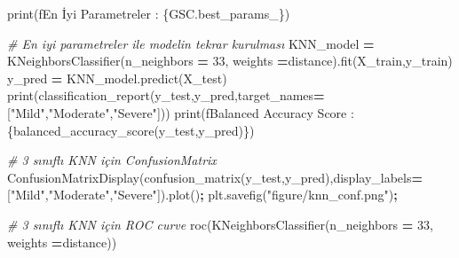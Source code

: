 \documentclass[12pt,twoside]{deuthesis}
\newenvironment{Shaded}{\begin{snugshade}}{\end{snugshade}}
\newcommand{\BuiltInTok}[1]{#1}
\newcommand{\CommentTok}[1]{\textcolor[rgb]{0.56,0.35,0.01}{\textit{#1}}}
\newcommand{\DecValTok}[1]{\textcolor[rgb]{0.00,0.00,0.81}{#1}}
\newcommand{\NormalTok}[1]{#1}
\newcommand{\OperatorTok}[1]{\textcolor[rgb]{0.81,0.36,0.00}{\textbf{#1}}}
\newcommand{\SpecialCharTok}[1]{\textcolor[rgb]{0.00,0.00,0.00}{#1}}
\newcommand{\SpecialStringTok}[1]{\textcolor[rgb]{0.31,0.60,0.02}{#1}}
\newcommand{\StringTok}[1]{\textcolor[rgb]{0.31,0.60,0.02}{#1}}
\begin{document}
\begin{Shaded}
\begin{Highlighting}[]
\BuiltInTok{print}\NormalTok{(}\SpecialStringTok{f\textquotesingle{}En İyi Parametreler : }\SpecialCharTok{\{}\NormalTok{GSC}\SpecialCharTok{.}\NormalTok{best\_params\_}\SpecialCharTok{\}}\SpecialStringTok{\textquotesingle{}}\NormalTok{)}
\end{Highlighting}
\end{Shaded}
\begin{Shaded}
\begin{Highlighting}[]
\CommentTok{\# En iyi parametreler ile modelin tekrar kurulması}
\NormalTok{KNN\_model }\OperatorTok{=}\NormalTok{ KNeighborsClassifier(n\_neighbors }\OperatorTok{=} \DecValTok{33}\NormalTok{,}
\NormalTok{                                 weights }\OperatorTok{=}\StringTok{\textquotesingle{}distance\textquotesingle{}}\NormalTok{).fit(X\_train,y\_train)}
\NormalTok{y\_pred }\OperatorTok{=}\NormalTok{ KNN\_model.predict(X\_test)}
\BuiltInTok{print}\NormalTok{(classification\_report(y\_test,y\_pred,target\_names}\OperatorTok{=}\NormalTok{[}\StringTok{"Mild"}\NormalTok{,}\StringTok{"Moderate"}\NormalTok{,}\StringTok{"Severe"}\NormalTok{]))}
\BuiltInTok{print}\NormalTok{(}\SpecialStringTok{f\textquotesingle{}Balanced Accuracy Score : }\SpecialCharTok{\{}\NormalTok{balanced\_accuracy\_score(y\_test,y\_pred)}\SpecialCharTok{\}}\SpecialStringTok{\textquotesingle{}}\NormalTok{)}
\end{Highlighting}
\end{Shaded}
\begin{Shaded}
\begin{Highlighting}[]
\CommentTok{\# 3 sınıflı KNN için ConfusionMatrix}
\NormalTok{ConfusionMatrixDisplay(confusion\_matrix(y\_test,y\_pred),display\_labels}\OperatorTok{=}\NormalTok{[}\StringTok{"Mild"}\NormalTok{,}\StringTok{"Moderate"}\NormalTok{,}\StringTok{"Severe"}\NormalTok{]).plot()}\OperatorTok{;}
\NormalTok{plt.savefig(}\StringTok{"figure/knn\_conf.png"}\NormalTok{)}\OperatorTok{;}
\end{Highlighting}
\end{Shaded}
\begin{Shaded}
\begin{Highlighting}[]
\CommentTok{\# 3 sınıflı KNN için ROC curve}
\NormalTok{roc(KNeighborsClassifier(n\_neighbors }\OperatorTok{=} \DecValTok{33}\NormalTok{,}
\NormalTok{                         weights }\OperatorTok{=}\StringTok{\textquotesingle{}distance\textquotesingle{}}\NormalTok{))}
\end{Highlighting}
\end{Shaded}
\end{document}
